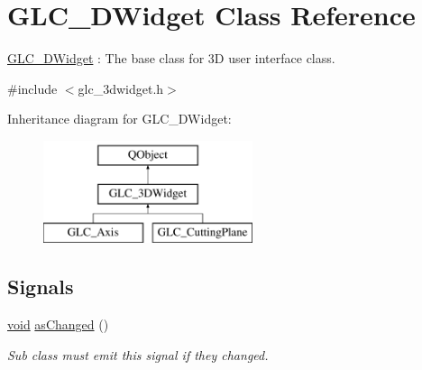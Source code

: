 \hypertarget{class_g_l_c__3_d_widget}{\section{G\-L\-C\-\_\-D\-Widget Class Reference}
\label{class_g_l_c__3_d_widget}
}


\hyperlink{class_g_l_c__3_d_widget}{G\-L\-C\-\_\-D\-Widget} \-: The base class for 3\-D user interface class.  




{\ttfamily \#include $<$glc\-\_\-3dwidget.\-h$>$}

Inheritance diagram for G\-L\-C\-\_\-D\-Widget\-:\begin{figure}[H]
\begin{center}
\leavevmode
\includegraphics[height=3.000000cm]{class_g_l_c__3_d_widget}
\end{center}
\end{figure}
\subsection*{Signals}
\begin{DoxyCompactItemize}
\item 
\hyperlink{group___u_a_v_objects_plugin_ga444cf2ff3f0ecbe028adce838d373f5c}{void} \hyperlink{class_g_l_c__3_d_widget_ad010177edd85c7be329095413663fe03}{as\-Changed} ()
\begin{DoxyCompactList}\small\item\em Sub class must emit this signal if they changed. \end{DoxyCompactList}\end{DoxyCompactItemize}
